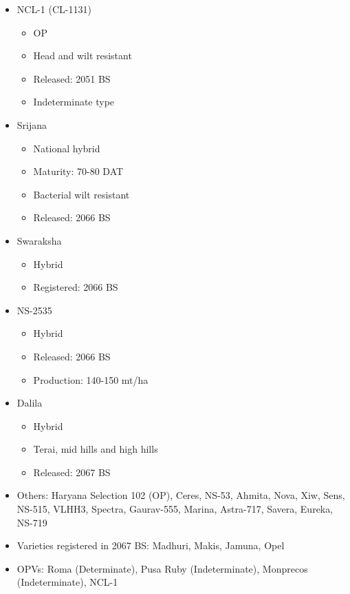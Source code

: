 \documentclass[
  ignorenonframetext,
  aspectratio=169]{beamer}
\providecommand{\tightlist}{%
  \setlength{\itemsep}{0pt}\setlength{\parskip}{0pt}}
\begin{document}
\begin{frame}{}
\protect\hypertarget{section-2}{}
\begin{itemize}
\tightlist
\item
  NCL-1 (CL-1131)

  \begin{itemize}
  \tightlist
  \item
    OP
  \item
    Head and wilt resistant
  \item
    Released: 2051 BS
  \item
    Indeterminate type
  \end{itemize}
\item
  Srijana

  \begin{itemize}
  \tightlist
  \item
    National hybrid
  \item
    Maturity: 70-80 DAT
  \item
    Bacterial wilt resistant
  \item
    Released: 2066 BS
  \end{itemize}
\item
  Swaraksha

  \begin{itemize}
  \tightlist
  \item
    Hybrid
  \item
    Registered: 2066 BS
  \end{itemize}
\end{itemize}
\end{frame}

\begin{frame}{}
\protect\hypertarget{section-3}{}
\begin{itemize}
\tightlist
\item
  NS-2535

  \begin{itemize}
  \tightlist
  \item
    Hybrid
  \item
    Released: 2066 BS
  \item
    Production: 140-150 mt/ha
  \end{itemize}
\item
  Dalila

  \begin{itemize}
  \tightlist
  \item
    Hybrid
  \item
    Terai, mid hills and high hills
  \item
    Released: 2067 BS
  \end{itemize}
\item
  Others: Haryana Selection 102 (OP), Ceres, NS-53, Ahmita, Nova, Xiw,
  Sens, NS-515, VLHH3, Spectra, Gaurav-555, Marina, Astra-717, Savera,
  Eureka, NS-719
\item
  Varieties registered in 2067 BS: Madhuri, Makis, Jamuna, Opel
\item
  OPVs: Roma (Determinate), Pusa Ruby (Indeterminate), Monprecos
  (Indeterminate), NCL-1
\end{itemize}
\end{frame}
\end{document}
